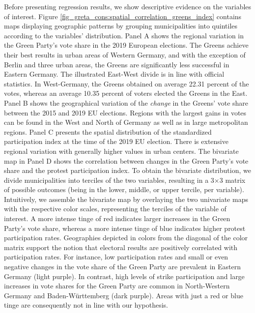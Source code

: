 Before presenting regression results, we show descriptive evidence on the variables of interest. Figure \ref{fig_greta_cons:spatial_correlation_greens_index} contains maps displaying geographic patterns by grouping municipalities into quintiles according to the variables' distribution. Panel A shows the regional variation in the Green Party's vote share in the 2019 European elections. The Greens achieve their best results in urban areas of Western Germany, and with the exception of Berlin and three urban areas, the Greens are significantly less successful in Eastern Germany. The illustrated East-West divide is in line with official statistics. In West-Germany, the Greens obtained on average 22.31 percent of the votes, whereas an average 10.35 percent of voters elected the Greens in the East. Panel B shows the geographical variation of the \textit{change} in the Greens' vote share between the 2015 and 2019 EU elections. Regions with the largest gains in votes can be found in the West and North of Germany as well as in large metropolitan regions. Panel C presents the spatial distribution of the standardized participation index at the time of the 2019 EU election. There is extensive regional variation with generally higher values in urban centers. The bivariate map in Panel D shows the correlation between changes in the Green Party's vote share and the protest participation index. To obtain the bivariate distribution, we divide municipalities into terciles of the two variables, resulting in a 3$\times$3 matrix of possible outcomes (being in the lower, middle, or upper tercile, per variable). Intuitively, we assemble the bivariate map by overlaying the two univariate maps with the respective color scales, representing the terciles of the variable of interest. A more intense tinge of red indicates larger increases in the Green Party's vote share, whereas a more intense tinge of blue indicates higher protest participation rates. Geographies depicted in colors from the diagonal of the color matrix support the notion that electoral results are positively correlated with participation rates. For instance, low participation rates and small or even negative changes in the vote share of the Green Party are prevalent in Eastern Germany (light purple). In contrast, high levels of strike participation and large increases in vote shares for the Green Party are common in North-Western Germany and Baden-Württemberg (dark purple). Areas with just a red or blue tinge are consequently not in line with our hypothesis.





